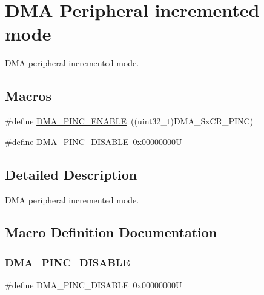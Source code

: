 \hypertarget{group___d_m_a___peripheral__incremented__mode}{}\section{D\+MA Peripheral incremented mode}
\label{group___d_m_a___peripheral__incremented__mode}


D\+MA peripheral incremented mode.  


\subsection*{Macros}
\begin{DoxyCompactItemize}
\item 
\#define \mbox{\hyperlink{group___d_m_a___peripheral__incremented__mode_gab6d84e5805302516d26c06fb4497a346}{D\+M\+A\+\_\+\+P\+I\+N\+C\+\_\+\+E\+N\+A\+B\+LE}}~((uint32\+\_\+t)D\+M\+A\+\_\+\+Sx\+C\+R\+\_\+\+P\+I\+NC)
\item 
\#define \mbox{\hyperlink{group___d_m_a___peripheral__incremented__mode_ga63e2aff2973d1a8f01d5d7b6e4894f39}{D\+M\+A\+\_\+\+P\+I\+N\+C\+\_\+\+D\+I\+S\+A\+B\+LE}}~0x00000000U
\end{DoxyCompactItemize}


\subsection{Detailed Description}
D\+MA peripheral incremented mode. 



\subsection{Macro Definition Documentation}
\mbox{\label{group___d_m_a___peripheral__incremented__mode_ga63e2aff2973d1a8f01d5d7b6e4894f39}} 
\subsubsection{\texorpdfstring{D\+M\+A\+\_\+\+P\+I\+N\+C\+\_\+\+D\+I\+S\+A\+B\+LE}{DMA\_PINC\_DISABLE}}
{\footnotesize\ttfamily \#define D\+M\+A\+\_\+\+P\+I\+N\+C\+\_\+\+D\+I\+S\+A\+B\+LE~0x00000000U}

